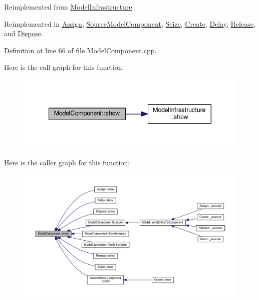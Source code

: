 Reimplemented from \hyperlink{class_model_infrastructure_a649a5a89a0c9931783d3c51de2acf266}{Model\-Infrastructure}.



Reimplemented in \hyperlink{class_assign_af5022b92204adcd9ee3e444b7e316d07}{Assign}, \hyperlink{class_source_model_component_a4011597b5780fcc0495e8e22ab8158f6}{Source\-Model\-Component}, \hyperlink{class_seize_a495ace3a156680b5816c8b285135322c}{Seize}, \hyperlink{class_create_a8d1832d2165bbeea4a5a88aded883f86}{Create}, \hyperlink{class_delay_af8187e4515417b547dc22b5ee0a1f95d}{Delay}, \hyperlink{class_release_a1ec7b35553820f0f228f31be1df468c3}{Release}, and \hyperlink{class_dispose_aee8ef98d5ca22eb18a97b258ed059865}{Dispose}.



Definition at line 66 of file Model\-Component.\-cpp.



Here is the call graph for this function\-:\nopagebreak
\begin{figure}[H]
\begin{center}
\leavevmode
\includegraphics[width=340pt]{class_model_component_ad8bc846e36b028eab7efb7da6c549eca_cgraph}
\end{center}
\end{figure}




Here is the caller graph for this function\-:
\nopagebreak
\begin{figure}[H]
\begin{center}
\leavevmode
\includegraphics[width=350pt]{class_model_component_ad8bc846e36b028eab7efb7da6c549eca_icgraph}
\end{center}
\end{figure}


